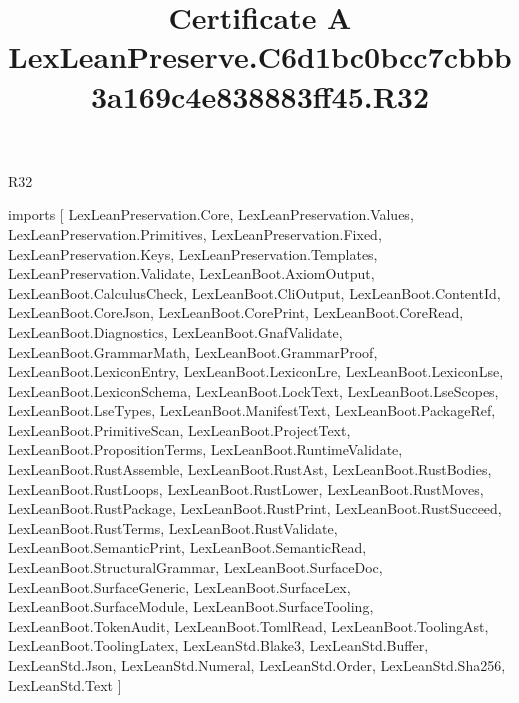 \begin{lexlean}{R32}
\title{Certificate A LexLeanPreserve.C6d1bc0bcc7cbbb3a169c4e838883ff45.R32}
\begin{coremodule}
imports [
  LexLeanPreservation.Core,
  LexLeanPreservation.Values,
  LexLeanPreservation.Primitives,
  LexLeanPreservation.Fixed,
  LexLeanPreservation.Keys,
  LexLeanPreservation.Templates,
  LexLeanPreservation.Validate,
  LexLeanBoot.AxiomOutput,
  LexLeanBoot.CalculusCheck,
  LexLeanBoot.CliOutput,
  LexLeanBoot.ContentId,
  LexLeanBoot.CoreJson,
  LexLeanBoot.CorePrint,
  LexLeanBoot.CoreRead,
  LexLeanBoot.Diagnostics,
  LexLeanBoot.GnafValidate,
  LexLeanBoot.GrammarMath,
  LexLeanBoot.GrammarProof,
  LexLeanBoot.LexiconEntry,
  LexLeanBoot.LexiconLre,
  LexLeanBoot.LexiconLse,
  LexLeanBoot.LexiconSchema,
  LexLeanBoot.LockText,
  LexLeanBoot.LseScopes,
  LexLeanBoot.LseTypes,
  LexLeanBoot.ManifestText,
  LexLeanBoot.PackageRef,
  LexLeanBoot.PrimitiveScan,
  LexLeanBoot.ProjectText,
  LexLeanBoot.PropositionTerms,
  LexLeanBoot.RuntimeValidate,
  LexLeanBoot.RustAssemble,
  LexLeanBoot.RustAst,
  LexLeanBoot.RustBodies,
  LexLeanBoot.RustLoops,
  LexLeanBoot.RustLower,
  LexLeanBoot.RustMoves,
  LexLeanBoot.RustPackage,
  LexLeanBoot.RustPrint,
  LexLeanBoot.RustSucceed,
  LexLeanBoot.RustTerms,
  LexLeanBoot.RustValidate,
  LexLeanBoot.SemanticPrint,
  LexLeanBoot.SemanticRead,
  LexLeanBoot.StructuralGrammar,
  LexLeanBoot.SurfaceDoc,
  LexLeanBoot.SurfaceGeneric,
  LexLeanBoot.SurfaceLex,
  LexLeanBoot.SurfaceModule,
  LexLeanBoot.SurfaceTooling,
  LexLeanBoot.TokenAudit,
  LexLeanBoot.TomlRead,
  LexLeanBoot.ToolingAst,
  LexLeanBoot.ToolingLatex,
  LexLeanStd.Blake3,
  LexLeanStd.Buffer,
  LexLeanStd.Json,
  LexLeanStd.Numeral,
  LexLeanStd.Order,
  LexLeanStd.Sha256,
  LexLeanStd.Text
]


\end{coremodule}
\end{lexlean}
